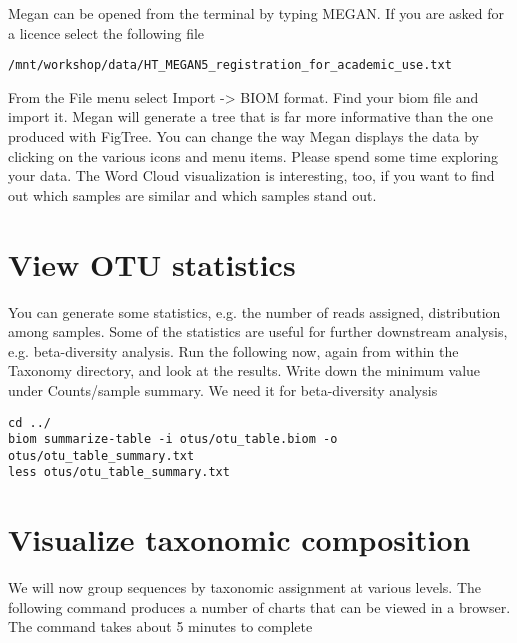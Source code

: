 \begin{steps}
Megan can be opened from the terminal by typing MEGAN. If you are asked for a licence select the following file 
\begin{lstlisting}
/mnt/workshop/data/HT_MEGAN5_registration_for_academic_use.txt 
\end{lstlisting}
\end{steps}

\begin{note}
From the File menu select Import -> BIOM format. Find your biom file and import it. Megan will generate a tree that is far more informative than the one produced with FigTree. You can change the way Megan displays the data by clicking on the various icons and menu items. Please spend some time exploring your data. The Word Cloud visualization is interesting, too, if you want to find out which samples are similar and which samples stand out.
\end{note}

\section{View OTU statistics}

\begin{information}
You can generate some statistics, e.g. the number of reads assigned, distribution among samples. Some of the statistics are useful for further downstream analysis, e.g. beta-diversity analysis. Run the following now, again from within the Taxonomy directory, and look at the results. Write down the minimum value under Counts/sample summary. We need it for beta-diversity analysis
\end{information}

\begin{steps}
\begin{lstlisting}
cd ../
biom summarize-table -i otus/otu_table.biom -o otus/otu_table_summary.txt
less otus/otu_table_summary.txt
\end{lstlisting}
\end{steps}


\section{Visualize taxonomic composition}
We will now group sequences by taxonomic assignment at various levels. The following command produces a number of charts that can be viewed in a browser. The command takes about 5 minutes to complete


